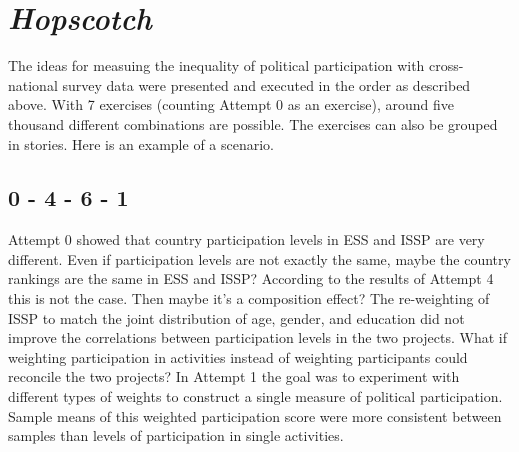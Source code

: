 \documentclass[12pt,]{article}
\begin{document}
\hypertarget{hopscotch}{%
\section{\texorpdfstring{\emph{Hopscotch}}{Hopscotch}}\label{hopscotch}}

The ideas for measuing the inequality of political participation with cross-national survey data were presented and executed in the order as described above. With 7 exercises (counting Attempt 0 as an exercise), around five thousand different combinations are possible. The exercises can also be grouped in stories. Here is an example of a scenario.

\hypertarget{section}{%
\subsection{0 - 4 - 6 - 1}\label{section}}

Attempt 0 showed that country participation levels in ESS and ISSP are very different. Even if participation levels are not exactly the same, maybe the country rankings are the same in ESS and ISSP? According to the results of Attempt 4 this is not the case. Then maybe it's a composition effect? The re-weighting of ISSP to match the joint distribution of age, gender, and education did not improve the correlations between participation levels in the two projects. What if weighting participation in activities instead of weighting participants could reconcile the two projects? In Attempt 1 the goal was to experiment with different types of weights to construct a single measure of political participation. Sample means of this weighted participation score were more consistent between samples than levels of participation in single activities.
\end{document}
